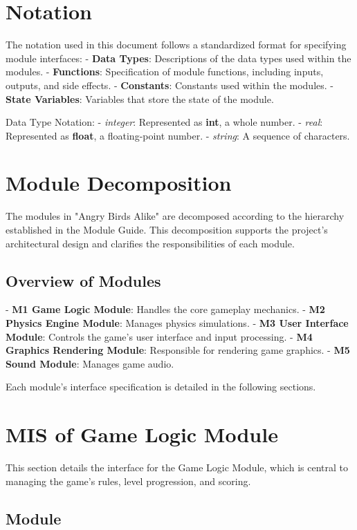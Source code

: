 \documentclass[12pt]{article}
\begin{document}
\section{Notation}
The notation used in this document follows a standardized format for specifying module interfaces:
- \textbf{Data Types}: Descriptions of the data types used within the modules.
- \textbf{Functions}: Specification of module functions, including inputs, outputs, and side effects.
- \textbf{Constants}: Constants used within the modules.
- \textbf{State Variables}: Variables that store the state of the module.

Data Type Notation:
- \textit{integer}: Represented as \textbf{int}, a whole number.
- \textit{real}: Represented as \textbf{float}, a floating-point number.
- \textit{string}: A sequence of characters.

\section{Module Decomposition}
The modules in "Angry Birds Alike" are decomposed according to the hierarchy established in the Module Guide. This decomposition supports the project's architectural design and clarifies the responsibilities of each module.

\subsection{Overview of Modules}
- \textbf{M1 Game Logic Module}: Handles the core gameplay mechanics.
- \textbf{M2 Physics Engine Module}: Manages physics simulations.
- \textbf{M3 User Interface Module}: Controls the game's user interface and input processing.
- \textbf{M4 Graphics Rendering Module}: Responsible for rendering game graphics.
- \textbf{M5 Sound Module}: Manages game audio.

Each module's interface specification is detailed in the following sections.
\section{MIS of Game Logic Module}

This section details the interface for the Game Logic Module, which is central to managing the game's rules, level progression, and scoring.

\subsection{Module}
\end{document}
